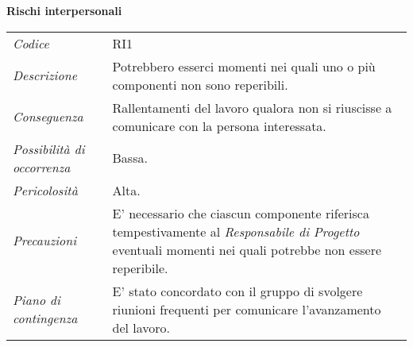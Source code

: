 {{{{{{{{{{{\quad
\begin{center}
	\LARGE\textbf{Rischi interpersonali}
\end{center}

\def\tabularxcolumn#1{m{#1}}
{

	\begin{center}
		\renewcommand{\arraystretch}{1.4}

		\begin{longtable}{|p{5cm}|p{12cm}|}
			\hline
			\rowcolor{airforceblue}
			\multicolumn{2}{|c|}{\textit{Comunicazione interna}}\\
			\hline
			\textit{Codice} & RI1 \\
			\hline
			\textit{Descrizione} & Potrebbero esserci momenti nei quali uno o più componenti non sono reperibili. \\
			\hline
			\textit{Conseguenza} & Rallentamenti del lavoro qualora non si riuscisse a comunicare con la persona interessata. \\
			\hline
			\textit{Possibilità di occorrenza} & Bassa. \\
			\hline
			\textit{Pericolosità} & Alta. \\
			\hline
			\textit{Precauzioni} & E' necessario che ciascun componente riferisca tempestivamente al \textit{Responsabile di Progetto} eventuali momenti nei quali potrebbe non essere reperibile. \\
			\hline
			\textit{Piano di contingenza} & E' stato concordato con il gruppo di svolgere riunioni frequenti per comunicare l'avanzamento del lavoro.\\
			\hline
		\end{longtable}
	\end{center}

\def\tabularxcolumn#1{m{#1}}
{
	
	\begin{center}
		\renewcommand{\arraystretch}{1.4}
		

\end{center}}}}}}}}}}}}}}
